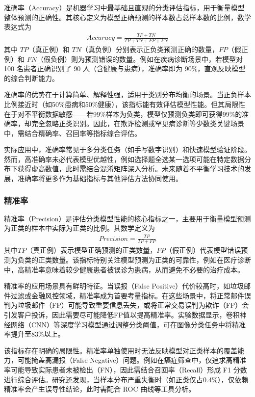 准确率（Accuracy）是机器学习中最基础且直观的分类评估指标，用于衡量模型整体预测的正确性。其核心定义为模型正确预测的样本数占总样本数的比例，数学表达式为 
\begin{align}
    Accuracy = \frac{TP+TN}{TP+TN+FP+FN}
\end{align}
其中 $TP$（真正例）和 $TN$（真负例）分别表示正负类预测正确的数量，$FP$（假正例）和 $FN$（假负例）则为预测错误的数量。例如在疾病诊断场景中，若模型对 100 名患者正确识别了 90 人（含健康与患病），准确率即为 90\%，直观反映模型的综合判断能力。

准确率的优势在于计算简单、解释性强，适用于类别分布均衡的场景。当正负样本比例接近时（如50\%患病和50\%健康），该指标能有效评估模型性能。但其局限性在于对不平衡数据敏感——若99\%样本为负类，模型仅预测负类即可获得99\%的准确率，却完全忽略正类识别。因此，在欺诈检测或罕见病诊断等少数类关键场景中，需结合精确率、召回率等指标综合评估。

实际应用中，准确率常见于多分类任务（如手写数字识别）和快速模型验证阶段。然而，高准确率未必代表模型优越性，例如选择题全选某一选项可能在特定数据分布下获得虚高数值，此时需结合混淆矩阵深入分析。未来随着不平衡学习技术的发展，准确率将更多作为基础指标与其他评估方法协同使用。

\subsubsection{精准率}

精准率（Precision）是评估分类模型性能的核心指标之一，主要用于衡量模型预测为正类的样本中实际为正类的比例。其数学定义为
\begin{align}
    Precision = \frac{TP}{TP+FP}
\end{align}
其中$TP$（真正例）表示模型正确预测的正类数量，$FP$（假正例）代表模型错误预测为负类的正类数量。该指标特别关注模型预测为正类的可靠性，例如在医疗诊断中，高精准率意味着较少健康患者被误诊为患病，从而避免不必要的治疗成本。

精准率的应用场景具有鲜明特征。当误报（False Positive）代价较高时，如垃圾邮件过滤或金融风控领域，精准率成为首要考量指标。在这些场景中，将正常邮件误判为垃圾邮件（FP）可能导致重要信息丢失，或将正常交易误判为欺诈（FP）会引发客户投诉，因此需要尽可能降低FP值以提高精准率。实验数据显示，卷积神经网络（CNN）等深度学习模型通过调整分类阈值，可在图像分类任务中将精准率提升至83\%以上。

该指标存在明确的局限性。精准率单独使用时无法反映模型对正类样本的覆盖能力，可能掩盖高漏报（False Negative）问题。例如在癌症筛查中，仅追求高精准率可能导致实际患者未被检出（FN），因此需结合召回率（Recall）形成 F1 分数进行综合评估。研究还发现，当样本分布严重失衡时（如正类仅占0.4\%），仅依赖精准率会产生误导性结论，此时需配合 ROC 曲线等工具分析。

